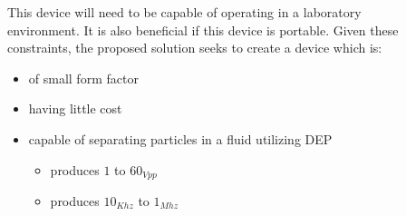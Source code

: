 \documentclass[25pt, a0paper, portrait, margin=0mm, innermargin=15mm, blockverticalspace=15mm, colspace=15mm, subcolspace=8mm]{tikzposter}
\begin{document}
\begin{columns}
{%
}



{
\begin{multicols}{2}

This device will need to be capable of operating in a laboratory environment.
It is also beneficial if this device is portable.
%
Given these constraints, the proposed solution seeks to create a device which is:
\begin{itemize}
\item of small form factor
\item having little cost
\item capable of separating particles in a fluid utilizing DEP
  \begin{itemize}
  \item produces $1$ to $60_{Vpp}$
  \item produces $10_{Khz}$ to $1_{Mhz}$
  \end{itemize}
\end{itemize}

\end{multicols}
}

{
\begin{multicols}{2}


\end{multicols}}
\end{columns}
\end{document}
